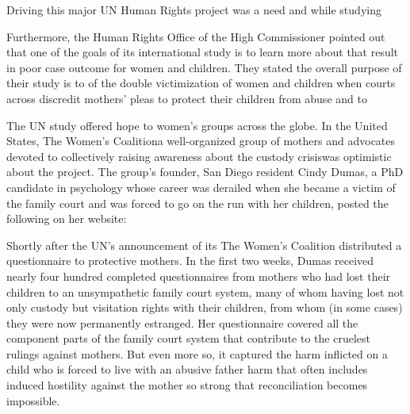 Driving this major UN Human Rights project was a need  and  while studying  \pfl{}

Furthermore, the Human Rights Office of the High Commissioner
pointed out that one of the goals of its international study is to learn
more about  that result in poor
case outcome for women and children. They stated the overall purpose
of their study is to  of the
double victimization of women and children when courts across  discredit mothers' pleas
to protect their children from abuse and to \hspace{1pt} \pfl{}

The UN study offered hope to women's groups across the globe. In
the United States, The Women's Coalition\mdash{}a well-organized group of
mothers and advocates devoted to collectively raising awareness about
the custody crisis\mdash{}was optimistic about the project. The group's founder,
San Diego resident Cindy Dumas, a PhD candidate in psychology whose
career was derailed when she became a victim of the family court and
was forced to go on the run with her children, posted the following on
her website:

 \pfl{}

Shortly after the UN's announcement of its  The Women's Coalition 
distributed a questionnaire to protective mothers.
In the first two weeks, Dumas received nearly four hundred
completed questionnaires from mothers who had lost their children to an
unsympathetic family court system, many of whom having lost not 
only custody but visitation rights with their children, 
from whom (in some cases) they were now permanently estranged.
Her questionnaire covered all
the component parts of the family court system that contribute to the
cruelest rulings against mothers. But even more so, it captured the harm
inflicted on a child who is forced to live with an abusive father\mdash{}
harm that often includes induced hostility against the mother so strong that
reconciliation becomes impossible. \pfl{}


